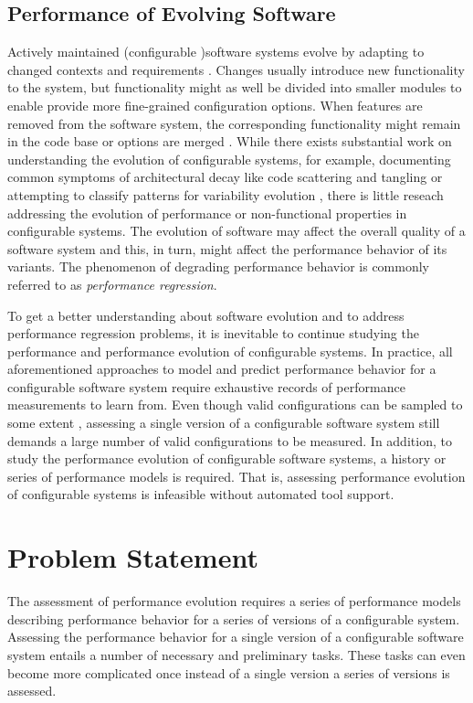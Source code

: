 \subsection{Performance of Evolving Software}

Actively maintained (configurable )software systems evolve by adapting to changed
contexts and requirements \citep{peng_analyzing_2011}. Changes usually
introduce new functionality to the system, but functionality might as well be
divided into smaller modules to enable provide more fine-grained configuration
options. When features are removed from the software system, the
corresponding functionality might remain in the code base or options are merged
\citep{apel_feature-oriented_2013}.  While there
exists substantial work on understanding the evolution of configurable systems,
for example, documenting common symptoms of architectural decay
like code scattering and tangling \citep{passos_feature_2015,zhang_variability_2013} or attempting to
classify patterns for variability evolution
\citep{seidl_co-evolution_2012,peng_analyzing_2011,passos_towards_2012}, there
is little reseach addressing the evolution of performance or non-functional
properties in configurable systems. {\color{red}The evolution of software may
affect the overall quality of a software system and this, in turn, might affect the
performance behavior of its variants. The phenomenon of degrading performance
behavior is commonly referred to as \emph{performance regression}.}

To get a better understanding about software evolution and to address
performance regression problems, it is inevitable to continue
studying the performance and performance evolution of configurable systems. In practice, all
aforementioned approaches to model and predict performance behavior for a
configurable software system require exhaustive records of performance
measurements to learn from. Even though valid configurations can be sampled to
some extent \citep{apel_feature-oriented_2013,siegmund_performance-influence_2015}, assessing a single version
of a configurable software system still demands a large number of valid configurations to be measured. In
addition, to study the performance evolution of configurable software systems,
a history or series of performance models is required. That is, assessing
performance evolution of configurable systems is infeasible without
automated tool support.

\section{Problem Statement}
The assessment of performance evolution requires a series of performance models
describing performance behavior for a series of versions of a configurable
system. Assessing the performance behavior for a single version of a
configurable software system entails a number of necessary and preliminary
tasks. These tasks can even become more complicated once instead of a single
version a series of versions is assessed.

